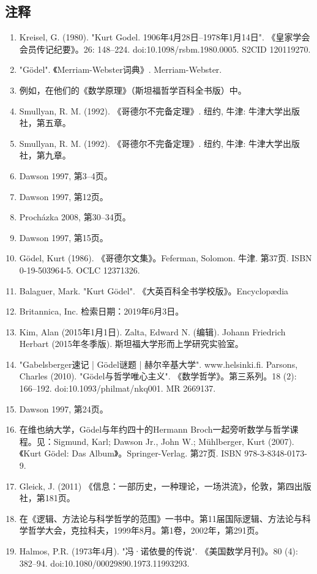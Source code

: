 \subsection{注释}  
\begin{enumerate}
\item Kreisel, G. (1980). "Kurt Godel. 1906年4月28日–1978年1月14日". 《皇家学会会员传记纪要》。26: 148–224. doi:10.1098/rsbm.1980.0005. S2CID 120119270.  
\item "Gödel". 《Merriam-Webster词典》. Merriam-Webster.  
\item 例如，在他们的《数学原理》（斯坦福哲学百科全书版）中。  
\item Smullyan, R. M. (1992). 《哥德尔不完备定理》. 纽约, 牛津: 牛津大学出版社，第五章。  
\item Smullyan, R. M. (1992). 《哥德尔不完备定理》. 纽约, 牛津: 牛津大学出版社，第九章。  
\item Dawson 1997, 第3–4页。  
\item Dawson 1997, 第12页。  
\item Procházka 2008, 第30–34页。  
\item Dawson 1997, 第15页。  
\item Gödel, Kurt (1986). 《哥德尔文集》。Feferman, Solomon. 牛津. 第37页. ISBN 0-19-503964-5. OCLC 12371326.  
\item Balaguer, Mark. "Kurt Gödel". 《大英百科全书学校版》。Encyclopædia \item Britannica, Inc. 检索日期：2019年6月3日。  
\item Kim, Alan (2015年1月1日). Zalta, Edward N. (编辑). Johann Friedrich Herbart (2015年冬季版). 斯坦福大学形而上学研究实验室。  
\item "Gabelsberger速记 | Gödel谜题 | 赫尔辛基大学". www.helsinki.fi.  
Parsons, Charles (2010). "Gödel与哲学唯心主义". 《数学哲学》。第三系列。18 (2): 166–192. doi:10.1093/philmat/nkq001. MR 2669137.  
\item Dawson 1997, 第24页。  
\item 在维也纳大学，Gödel与年约四十的Hermann Broch一起旁听数学与哲学课程。见：Sigmund, Karl; Dawson Jr., John W.; Mühlberger, Kurt (2007). 《Kurt Gödel: Das Album》。Springer-Verlag. 第27页. ISBN 978-3-8348-0173-9.  
\item Gleick, J. (2011) 《信息：一部历史，一种理论，一场洪流》，伦敦，第四出版社，第181页。
\item 在《逻辑、方法论与科学哲学的范围》一书中。第11届国际逻辑、方法论与科学哲学大会，克拉科夫，1999年8月。第1卷，2002年，第291页。  
\item Halmos, P.R. (1973年4月). "冯·诺依曼的传说". 《美国数学月刊》。80 (4): 382–94. doi:10.1080/00029890.1973.11993293.  

\end{enumerate}
